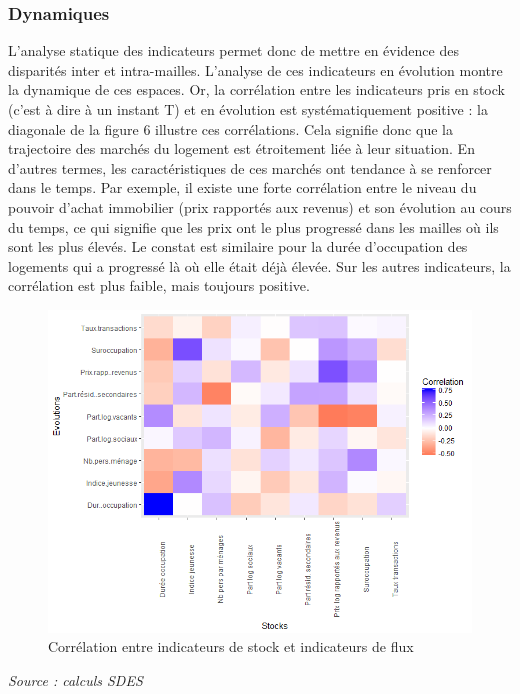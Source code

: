\documentclass[12pt, a4paper]{article}
\begin{document}
\subsubsection{Dynamiques}

L'analyse statique des indicateurs permet donc de mettre en évidence des disparités inter et intra-mailles. L'analyse de ces indicateurs en évolution montre la dynamique de ces espaces. Or, la corrélation entre les indicateurs pris en stock (c'est à dire à un instant T) et en évolution est systématiquement positive : la diagonale de la figure 6 illustre ces corrélations. Cela signifie donc que la trajectoire des marchés du logement est étroitement liée à leur situation. En d'autres termes, les caractéristiques de ces marchés ont tendance à se renforcer dans le temps. Par exemple, il existe une forte corrélation entre le niveau du pouvoir d'achat immobilier (prix rapportés aux revenus) et son évolution au cours du temps, ce qui signifie que les prix ont le plus progressé dans les mailles où ils sont les plus élevés. Le constat est similaire pour la durée d'occupation des logements qui a progressé là où elle était déjà élevée. Sur les autres indicateurs, la corrélation est plus faible, mais toujours positive.

\begin{figure}[H]
\caption{Corrélation entre indicateurs de stock et indicateurs de flux}
\begin{center}
\includegraphics[scale=.8]{img/Dynam.png}
\end{center}
\end{figure}
\emph{Source : calculs SDES}

\nocite{*}
%
%
\end{document}

